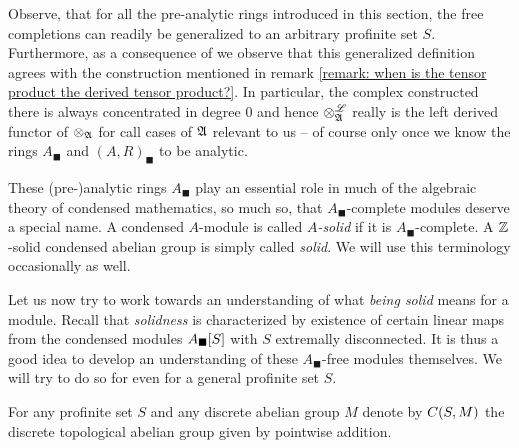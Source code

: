 \begin{remark}
	\label{remark: free completions for profinite sets}
	
	Observe, that for all the pre-analytic rings introduced in this section, the free completions can readily be generalized to an arbitrary profinite set $S$. Furthermore, as a consequence of \cite[Prop. 5.6]{condenseddotpdf} we observe that this generalized definition agrees with the construction mentioned in remark \ref{remark: when is the tensor product the derived tensor product?}. In particular, the complex constructed there is always concentrated in degree $0$ and hence $\otimes^{\mathscr{L}}_{\mathfrak{A}}$ really is the left derived functor of $\otimes_{\mathfrak{A}}$ for call cases of ${\mathfrak{A}}$ relevant to us -- of course only once we know the rings $A_\blacksquare$ and $(A, R)_\blacksquare$ to be analytic.
\end{remark}

\begin{remark}[Solidness]
	These (pre-)analytic rings $A_\blacksquare$ play an essential role in much of the algebraic theory of condensed mathematics, so much so, that $A_\blacksquare$-complete modules deserve a special name. A condensed $A$-module is called \emph{$A$-solid} if it is $A_\blacksquare$-complete. A ${\mathbb{Z}}$-solid condensed abelian group is simply called \emph{solid}. We will use this terminology occasionally as well.
\end{remark}

Let us now try to work towards an understanding of what \emph{being solid} means for a module. Recall that \emph{solidness} is characterized by existence of certain linear maps from the condensed modules ${A_\blacksquare[S]}$ with $S$ extremally disconnected. It is thus a good idea to develop an understanding of these $A_\blacksquare$-free modules themselves. We will try to do so for even for a general profinite set $S$.
\begin{definition}
	For any profinite set $S$ and any discrete abelian group $M$ denote by ${C(S, M)}$ the discrete topological abelian group given by pointwise addition.
\end{definition}

